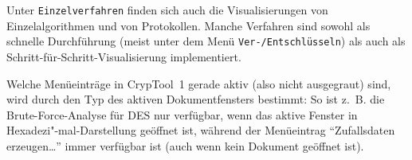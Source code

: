 Unter \verb#Einzelverfahren# finden sich auch die Visualisierungen von Einzelalgorithmen und von Protokollen. Manche Verfahren sind sowohl als schnelle Durchführung (meist unter dem Menü \verb#Ver-/Entschlüsseln#) als auch als
Schritt-für-Schritt-Visualisierung implementiert.

Welche Menüeinträge in CrypTool~1 gerade aktiv (also nicht ausgegraut) sind,
wird durch den Typ des aktiven Dokumentfensters bestimmt:
So ist z.~B. die Brute-Force-Analyse für DES
nur verfügbar, wenn das aktive Fenster in Hexadezi"-mal-Darstellung
geöffnet ist, während der Menüeintrag "`Zufallsdaten erzeugen\dots"'
immer verfügbar ist (auch wenn kein Dokument geöffnet ist).



\clearpage
\setlength{\hoffset}{-20mm} %


